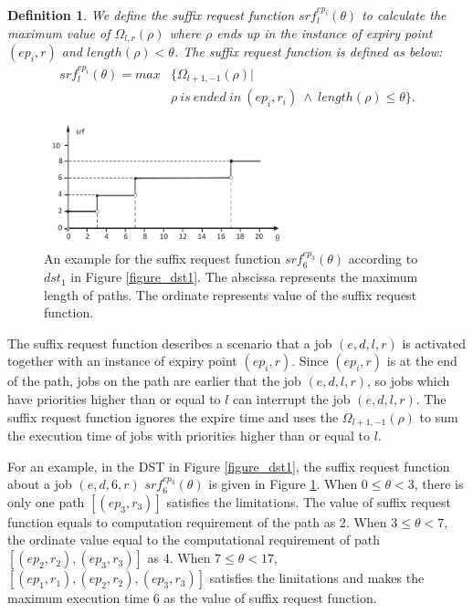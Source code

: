 \documentclass[10pt,conference]{IEEEtran}
\newtheorem{definition}{Definition}
\begin{document}
\begin{definition}
We define the suffix request function $srf^{ep_i}_{l}(\theta)$ to calculate the maximum value of $\Omega_{l,r}(\rho)$ where $\rho$ ends up in the instance of expiry point $(ep_i,r)$ and $length(\rho)<\theta$. The suffix request function is defined as below:
\begin{equation}
\begin{split}
srf^{ep_i}_l(\theta)=max&\{\Omega_{l+1,-1}(\rho)|
\\
&\rho\ is\ ended\ in\ (ep_i,r_i)\ \wedge\ length(\rho)\leq \theta\}.
\end{split}
\end{equation}\label{equation_srf}
\end{definition}
\begin{figure}[t]
  \centering
  \includegraphics[scale=0.547]{graphics/figure_srf-eps-converted-to.pdf}
  \caption{An example for the suffix request function $srf^{ep_3}_{6}(\theta)$ according to $dst_1$ in Figure \ref{figure_dst1}. The abscissa represents the maximum length of paths. The ordinate represents value of the suffix request function.} 
  \label{figure_srf}
\end{figure}

The suffix request function describes a scenario that a job $(e,d,l,r)$ is activated together with an instance of expiry point $(ep_i,r)$. Since $(ep_i,r)$ is at the end of the path, jobs on the path are earlier that the job $(e,d,l,r)$, so jobs which have priorities higher than or equal to $l$ can interrupt the job $(e,d,l,r)$. The suffix request function ignores the expire time and uses the $\Omega_{l+1,-1}(\rho)$ to sum the execution time of jobs with priorities higher than or equal to $l$.

For an example, in the DST in Figure \ref{figure_dst1}, the suffix request function about a job $(e,d,6,r)$ $srf^{ep_3}_{6}(\theta)$ is given in Figure \ref{figure_srf}. When $0\leq\theta<3$, there is only one path $[(ep_3,r_3)]$ satisfies the limitations. The value of suffix request function equals to computation requirement of the path as 2. When $3\leq\theta<7$, the ordinate value equal to the computational requirement of path $[(ep_2,r_2),(ep_3,r_3)]$ as 4. When $7\leq\theta<17$, $[(ep_1,r_1),(ep_2,r_2),(ep_3,r_3)]$ satisfies the limitations and makes the maximum execution time 6 as the value of suffix request function. 
\end{document}
